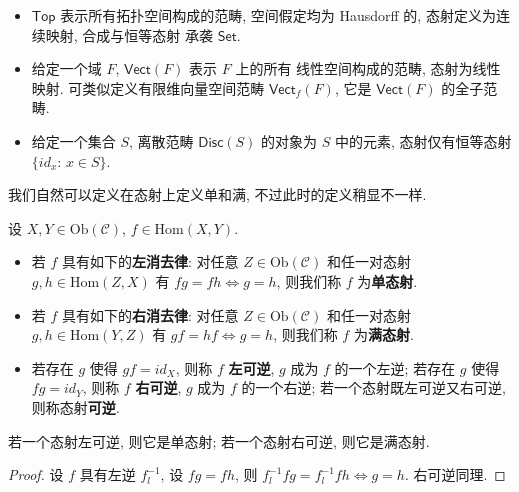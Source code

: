 \documentclass[UTF8]{book}
\begin{document}
\begin{example}
\begin{itemize}
        \item $\mathsf{Top}$ 表示所有拓扑空间构成的范畴, 
        空间假定均为 Hausdorff 的, 态射定义为连续映射, 合成与恒等态射
        承袭 $\mathsf{Set}$. 

        \item 给定一个域 $F$, $\mathsf{Vect}(F)$ 表示 $F$ 上的所有
        线性空间构成的范畴, 态射为线性映射. 
        可类似定义有限维向量空间范畴 $\mathsf{Vect}_f(F)$, 
        它是 $\mathsf{Vect}(F)$ 的全子范畴. 

        \item 给定一个集合 $S$, 离散范畴 $\mathsf{Disc}(S)$ 
        的对象为 $S$ 中的元素, 态射仅有恒等态射 $\{id_x:\,x\in S\}$.
    \end{itemize}
\end{example}

我们自然可以定义在态射上定义单和满, 不过此时的定义稍显不一样. 

\begin{definition}
    设 $X,Y \in \mathrm{Ob}(\mathcal{C})$, $f \in \mathrm{Hom}(X,Y)$. 
    \begin{itemize}
        \item 若 $f$ 具有如下的\textbf{左消去律}: 
        对任意 $Z\in \mathrm{Ob}(\mathcal{C})$ 和任一对态射 
        $g,h \in \mathrm{Hom}(Z,X)$ 有 
        $fg =fh \Longleftrightarrow g=h$, 
        则我们称 $f$ 为\textbf{单态射}. 

        \item 若 $f$ 具有如下的\textbf{右消去律}: 
        对任意 $Z\in \mathrm{Ob}(\mathcal{C})$ 和任一对态射 
        $g,h \in \mathrm{Hom}(Y,Z)$ 有 
        $gf =hf \Longleftrightarrow g=h$, 
        则我们称 $f$ 为\textbf{满态射}. 
        
        \item 若存在 $g$ 使得 $gf = id_X$, 则称 $f$ \textbf{左可逆}, 
        $g$ 成为 $f$ 的一个左逆; 
        若存在 $g$ 使得 $fg = id_Y$, 则称 $f$ \textbf{右可逆}, 
        $g$ 成为 $f$ 的一个右逆; 
        若一个态射既左可逆又右可逆, 则称态射\textbf{可逆}. 
    \end{itemize}
\end{definition}

\begin{proposition}
    若一个态射左可逆, 则它是单态射; 若一个态射右可逆, 则它是满态射. 
\end{proposition}

\begin{proof}
    设 $f$ 具有左逆 $f^{-1}_l$, 设 $fg =fh$, 则 
    $f^{-1}_lfg = f^{-1}_lfh \Longleftrightarrow g=h$. 
    右可逆同理. 
\end{proof}
\end{document}
